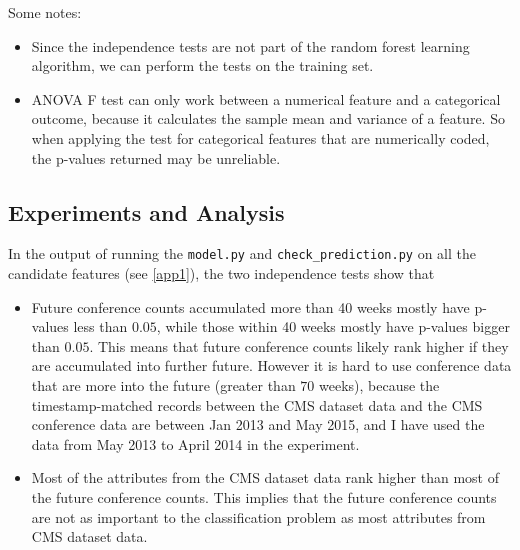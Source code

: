 \documentclass[preprint, 12pt]{elsarticle}
\begin{document}
Some notes:

\begin{itemize}

  \item Since the independence tests are not part of the random forest learning algorithm, we can perform the tests on the training set.

  \item ANOVA F test can only work between a numerical feature and a categorical outcome, because it calculates the sample mean and variance of a feature.
So when applying the test for categorical features that are numerically coded, the p-values returned may be unreliable.


\end{itemize}


\subsection{Experiments and Analysis}
 
In the output of running the \verb|model.py| and \verb|check_prediction.py| on all the candidate features (see \ref{app1}),
the two independence tests show that

\begin{itemize}

  \item
Future conference counts accumulated more than 40 weeks mostly have p-values less than $0.05$,
while those within 40 weeks mostly have p-values bigger than $0.05$.
This means that future conference counts likely rank higher if they are accumulated into further future.
However it is hard to use conference data that are more into the future (greater than $70$ weeks), because the timestamp-matched records between the CMS dataset data and the CMS conference data are between Jan 2013 and May 2015, and I have used the data from May 2013 to April 2014 in the experiment.

\item
  Most of the attributes from the CMS dataset data rank higher than most of the future conference counts.
This implies that the future conference counts are not as important to the classification problem as most attributes from CMS dataset data.

 \end{itemize} 
\end{document}
